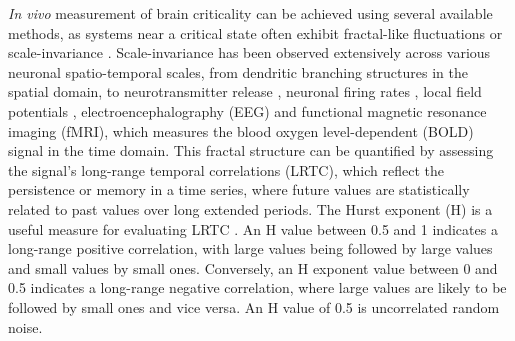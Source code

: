 \documentclass[
true
]{sn-jnl}
\begin{document}
\emph{In vivo} measurement of brain criticality can be achieved using
several available methods, as systems near a critical state often
exhibit fractal-like fluctuations or scale-invariance
\citep{munozColloquiumCriticalityDynamical2018}. Scale-invariance has
been observed extensively across various neuronal spatio-temporal
scales, from dendritic branching structures
\citep{casertaDeterminationFractalDimension1995} in the spatial domain,
to neurotransmitter release
\citep{lowenQuantalNeurotransmitterSecretion1997}, neuronal firing rates
\citep{mazzoniDynamicsSpontaneousActivity2007}, local field potentials
\citep{bedardMacroscopicModelsLocal2009}, electroencephalography (EEG)
\citep{bullmoreFractalAnalysisElectroencephalographic1994} and
functional magnetic resonance imaging (fMRI), which measures the blood
oxygen level-dependent (BOLD) signal
\citep{zarahnEmpiricalAnalysesBOLD1997, fadiliWaveletGeneralizedLeastSquares2002, campbellMonofractalAnalysisFunctional2022}
in the time domain. This fractal structure can be quantified by
assessing the signal's long-range temporal correlations (LRTC), which
reflect the persistence or memory in a time series, where future values
are statistically related to past values over long extended periods. The
Hurst exponent (H) is a useful measure for evaluating LRTC
\citep{ekeFractalCharacterizationComplexity2002, campbellMonofractalAnalysisFunctional2022}.
An H value between 0.5 and 1 indicates a long-range positive
correlation, with large values being followed by large values and small
values by small ones. Conversely, an H exponent value between 0 and 0.5
indicates a long-range negative correlation, where large values are
likely to be followed by small ones and vice versa. An H value of 0.5 is
uncorrelated random noise.
\end{document}
